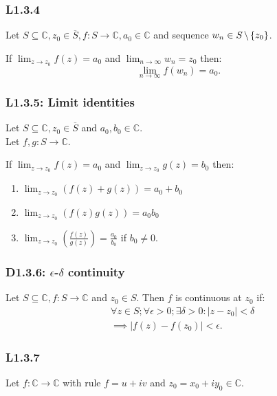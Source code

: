 \documentclass{article}
\begin{document}
\begin{multicols*}{3}
\subsubsection*{L1.3.4}
Let $S\subseteq\mathbb{C}, z_0\in\overline{S},
f:S\rightarrow\mathbb{C},a_0\in\mathbb{C}$ and sequence
$w_n\in S\hspace{0.02in}\backslash\hspace{0.02in}\{z_0\}$.

If $\displaystyle\lim_{z\rightarrow z_0}f(z)=a_0$
and $\displaystyle\lim_{n\rightarrow\infty}w_n=z_0$
then:
$$\lim_{n\rightarrow\infty}f(w_n)=a_0.$$

\subsubsection*{L1.3.5: Limit identities}
Let $S\subseteq\mathbb{C}, z_0\in\overline{S}$ and $a_0,b_0\in\mathbb{C}$. \\
Let $f,g:S\rightarrow\mathbb{C}$.

If $\displaystyle\lim_{z\rightarrow z_0}f(z)=a_0$
and $\displaystyle\lim_{z\rightarrow z_0}g(z)=b_0$
then:
\begin{enumerate}
    \item $\displaystyle\lim_{z\rightarrow z_0}
    (f(z)+g(z))=a_0+b_0$

    \item $\displaystyle\lim_{z\rightarrow z_0}
    (f(z)g(z))=a_0 b_0$

    \item $\displaystyle\lim_{z\rightarrow z_0}
    \left(\frac{f(z)}{g(z)}\right)=\frac{a_0}{b_0}$
    if $b_0\neq0$.
\end{enumerate}

\subsubsection*{D1.3.6: $\epsilon$-$\delta$ continuity}
Let $S\subseteq\mathbb{C}, f:S\rightarrow\mathbb{C}$
and $z_0\in S$.
Then $f$ is continuous at $z_0$ if:
\begin{align*}
    &\forall z\in S;\forall\epsilon>0;\exists\delta>0:
    |z-z_0|<\delta \\
    &\implies|f(z)-f(z_0)|<\epsilon.
\end{align*}

\subsubsection*{L1.3.7}
Let $f:\mathbb{C}\rightarrow\mathbb{C}$ with rule $f=u+iv$
and $z_0=x_0+iy_0\in\mathbb{C}$.


\end{multicols*}
\end{document}
